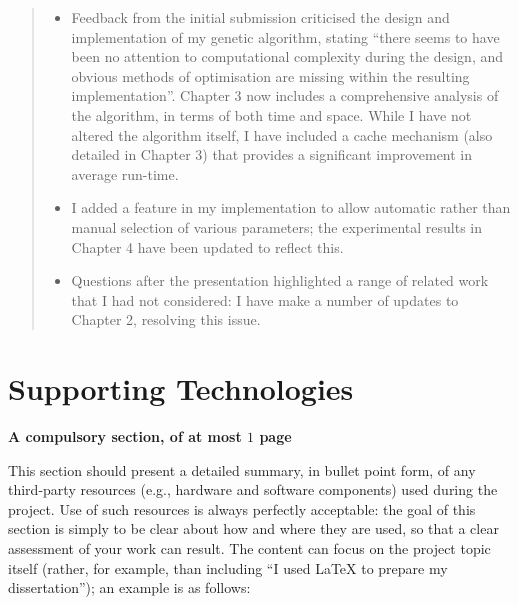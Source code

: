 \documentclass[ %
                    author={Daniel Page},
                supervisor={Dr. Andrew Calway},
                    degree={MSc},
                     title={Some Structural Guidelines for Data Science MSc Theses, Including Those With Long Titles that Run Across Multiple Lines on the Front Page},
                  subtitle={And those including an optional subtitle too, for good measure},
                      type={},
                      year={2021}]{dissertation}
\begin{document}
\begin{quote}
\noindent
\begin{itemize}
\item Feedback from the initial submission criticised the design and 
      implementation of my genetic algorithm, stating ``there seems 
      to have been no attention to computational complexity during the
      design, and obvious methods of optimisation are missing within
      the resulting implementation''.  Chapter 3 now includes a
      comprehensive analysis of the algorithm, in terms of both time
      and space.  While I have not altered the algorithm itself, I
      have included a cache mechanism (also detailed in Chapter 3)
      that provides a significant improvement in average run-time.
\item I added a feature in my implementation to allow automatic rather
      than manual selection of various parameters; the experimental
      results in Chapter 4 have been updated to reflect this.
\item Questions after the presentation highlighted a range of related
      work that I had not considered: I have make a number of updates 
      to Chapter 2, resolving this issue.
\end{itemize}
\end{quote}


\chapter*{Supporting Technologies}

{\bf A compulsory section, of at most $1$ page}
\vspace{1cm} 

\noindent
This section should present a detailed summary, in bullet point form, 
of any third-party resources (e.g., hardware and software components) 
used during the project.  Use of such resources is always perfectly 
acceptable: the goal of this section is simply to be clear about how
and where they are used, so that a clear assessment of your work can
result.  The content can focus on the project topic itself (rather,
for example, than including ``I used \mbox{\LaTeX} to prepare my 
dissertation''); an example is as follows:
\end{document}
